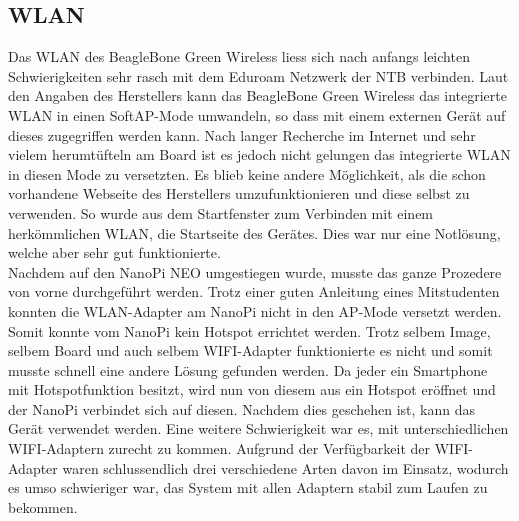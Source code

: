 \subsection{WLAN}
Das WLAN des BeagleBone Green Wireless liess sich nach anfangs leichten Schwierigkeiten sehr rasch mit dem Eduroam Netzwerk der NTB verbinden. Laut den Angaben des Herstellers kann das BeagleBone Green Wireless das integrierte WLAN in einen SoftAP-Mode umwandeln, so dass mit einem externen Gerät auf dieses zugegriffen werden kann. Nach langer Recherche im Internet und sehr vielem herumtüfteln am Board ist es jedoch nicht gelungen das integrierte WLAN in diesen Mode zu versetzten. Es blieb keine andere Möglichkeit, als die schon vorhandene Webseite des Herstellers umzufunktionieren und diese selbst zu verwenden. So wurde aus dem Startfenster zum Verbinden mit einem herkömmlichen WLAN, die Startseite des Gerätes. Dies war nur eine Notlösung, welche aber sehr gut funktionierte.\\
Nachdem auf den NanoPi NEO umgestiegen wurde, musste das ganze Prozedere von vorne durchgeführt werden. Trotz einer guten Anleitung eines Mitstudenten konnten die WLAN-Adapter am NanoPi nicht in den AP-Mode versetzt werden. Somit konnte vom NanoPi kein Hotspot errichtet werden. Trotz selbem Image, selbem Board und auch selbem WIFI-Adapter funktionierte es nicht und somit musste schnell eine andere Lösung gefunden werden. Da jeder ein Smartphone mit Hotspotfunktion besitzt, wird nun von diesem aus ein Hotspot eröffnet und der NanoPi verbindet sich auf diesen. Nachdem dies geschehen ist, kann das Gerät verwendet werden. Eine weitere Schwierigkeit war es, mit unterschiedlichen WIFI-Adaptern zurecht zu kommen. Aufgrund der Verfügbarkeit der WIFI-Adapter waren schlussendlich drei verschiedene Arten davon im Einsatz, wodurch es umso schwieriger war, das System mit allen Adaptern stabil zum Laufen zu bekommen.
